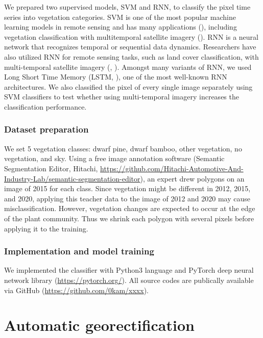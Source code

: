 \documentclass{article}
\begin{document}
We prepared two supervised models, SVM and RNN, to classify the pixel time series into vegetation categories. SVM is one of the most popular machine learning models in remote sensing and has many applications (\cite{Mountrakis2011SVMReview}), including vegetation classification with multitemporal satellite imagery (\cite{Tigges2013RemSenEnv}). RNN is a neural network that recognizes temporal or sequential data dynamics. Researchers have also utilized RNN for remote sensing tasks, such as land cover classification, with multi-temporal satellite imagery (\cite{Ienco2017RemSenLSTM}, \cite{Sharma2018NN}). Amongst many variants of RNN, we used Long Short Time Memory (LSTM, \cite{Hochreiter1997LSTM}), one of the most well-known RNN architectures. We also classified the pixel of every single image separately using SVM classifiers to test whether using multi-temporal imagery increases the classification performance.

\hypertarget{dataset-preparation}{%
\subsubsection{Dataset preparation}\label{dataset-preparation}}

We set 5 vegetation classes: dwarf pine, dwarf bamboo, other vegetation, no vegetation, and sky. Using a free image annotation software (Semantic Segmentation Editor, Hitachi, \url{https://github.com/Hitachi-Automotive-And-Industry-Lab/semantic-segmentation-editor}), an expert drew polygons on an image of 2015 for each class. Since vegetation might be different in 2012, 2015, and 2020, applying this teacher data to the image of 2012 and 2020 may cause misclassification. However, vegetation changes are expected to occur at the edge of the plant community. Thus we shrink each polygon with several pixels before applying it to the training.

\hypertarget{implementation-and-model-training}{%
\subsubsection{Implementation and model training}\label{implementation-and-model-training}}

We implemented the classifier with Python3 language and PyTorch deep neural network library (\url{https://pytorch.org/}). All source codes are publically available via GitHub (\url{https://github.com/0kam/xxxx}).

\hypertarget{automatic-georectification}{%
\section{Automatic georectification}\label{automatic-georectification}}
\end{document}
